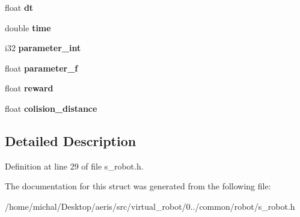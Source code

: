 \begin{DoxyCompactItemize}
\item 
\hypertarget{structsRobot_a8372b40f963ae1b085f475c88db6b95d}{float {\bfseries dt}}\label{structsRobot_a8372b40f963ae1b085f475c88db6b95d}

\item 
\hypertarget{structsRobot_aa052d09b89c7a23910fbb182eb83c1f9}{double {\bfseries time}}\label{structsRobot_aa052d09b89c7a23910fbb182eb83c1f9}

\item 
\hypertarget{structsRobot_a41c5367091185062b6c0427bea68e8fe}{i32 {\bfseries parameter\-\_\-int}}\label{structsRobot_a41c5367091185062b6c0427bea68e8fe}

\item 
\hypertarget{structsRobot_a0398e11d41ff96b5893e7a2483792c4b}{float {\bfseries parameter\-\_\-f}}\label{structsRobot_a0398e11d41ff96b5893e7a2483792c4b}

\item 
\hypertarget{structsRobot_a407e2628f2abc97ec7ac6470bdbd3d6f}{float {\bfseries reward}}\label{structsRobot_a407e2628f2abc97ec7ac6470bdbd3d6f}

\item 
\hypertarget{structsRobot_ad727fed7aeb4e6269ca956c06dc78df0}{float {\bfseries colision\-\_\-distance}}\label{structsRobot_ad727fed7aeb4e6269ca956c06dc78df0}

\end{DoxyCompactItemize}


\subsection{Detailed Description}


Definition at line 29 of file s\-\_\-robot.\-h.



The documentation for this struct was generated from the following file\-:\begin{DoxyCompactItemize}
\item 
/home/michal/\-Desktop/aeris/src/virtual\-\_\-robot/0../common/robot/s\-\_\-robot.\-h\end{DoxyCompactItemize}
